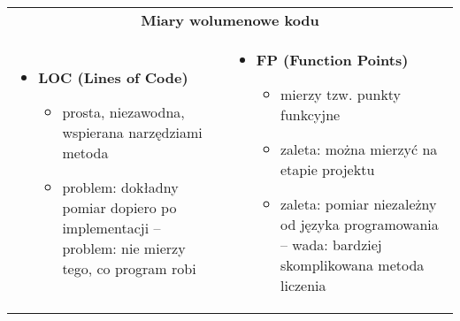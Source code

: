 \documentclass[../main.tex]{subfiles}
\begin{document}
    \begin{table}[H]
        \begin{center}
            \begin{tabular}{p{8cm} p{8cm}}
                \multicolumn{2}{c}{\textbf{Miary wolumenowe kodu}}\\

                \begin{itemize}
                    \item \textbf{LOC (Lines of Code)}
                    \begin{itemize}
                        \item prosta, niezawodna, wspierana narzędziami metoda
                        \item problem: dokładny pomiar dopiero po implementacji – problem: nie mierzy tego, co program robi
                    \end{itemize}
                \end{itemize}
                &
                \begin{itemize}
                    \item \textbf{FP (Function Points)}
                    \begin{itemize}
                        \item mierzy tzw. punkty funkcyjne
                        \item zaleta: można mierzyć na etapie projektu
                        \item zaleta: pomiar niezależny od języka programowania – wada: bardziej skomplikowana metoda liczenia
                    \end{itemize}
                \end{itemize}
            \end{tabular}
        \end{center}
    \end{table}
\end{document}
